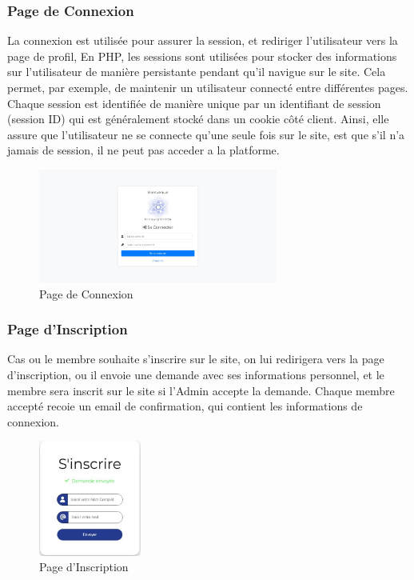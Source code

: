 \documentclass{article}
\begin{document}
            \subsubsection{Page de Connexion}
                La connexion est utilisée pour assurer la session, et rediriger l'utilisateur vers la page de profil, En PHP, les sessions sont utilisées pour stocker des informations sur l'utilisateur de manière persistante pendant qu'il navigue sur le site. Cela permet, par exemple, de maintenir un utilisateur connecté entre différentes pages. Chaque session est identifiée de manière unique par un identifiant de session (session ID) qui est généralement stocké dans un cookie côté client.
                Ainsi, elle assure que l'utilisateur ne se connecte qu'une seule fois sur le site, est que s'il n'a jamais de session, il ne peut pas acceder a la platforme.
                \begin{figure}[h!]
                    \centering
                    \includegraphics[width=0.7\textwidth]{assets/webSite/loginCollab.jpeg}
                    \caption{Page de Connexion}
                \end{figure}
                \FloatBarrier
            \subsubsection{Page d'Inscription}
                Cas ou le membre souhaite s'inscrire sur le site, on lui redirigera vers la page d'inscription, ou il envoie une demande avec ses informations personnel, et le membre sera inscrit sur le site si l'Admin accepte la demande.
                Chaque membre accepté recoie un email de confirmation, qui contient les informations de connexion.
                \begin{figure}[h!]
                    \centering
                    \includegraphics[width=0.3\textwidth]{assets/webSite/envoieDemande.jpeg}
                    \caption{Page d'Inscription}
                \end{figure}
                \FloatBarrier
\end{document}
